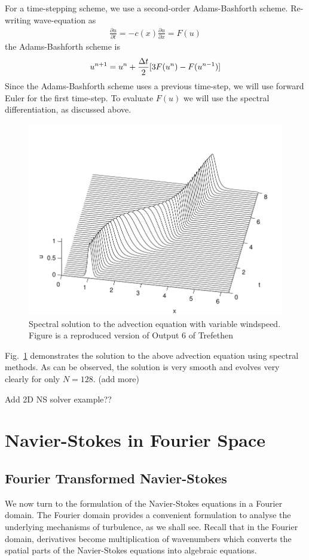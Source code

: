 For a time-stepping scheme, we use a second-order Adams-Bashforth\cite{durran} scheme. Re-writing wave-equation as
\begin{align}
\frac{\partial u}{\partial t} = -c(x)\frac{\partial u}{\partial x} = F(u)
\end{align}
the Adams-Bashforth scheme is
\begin{align}
u^{n+1} = u^{n} + \frac{\Delta t}{2}[3F(u^{n})-F(u^{n-1})]
\end{align}
Since the Adams-Bashforth scheme uses a previous time-step, we will use forward Euler for the first time-step. To evaluate $F(u)$ we will use the spectral differentiation, as discussed above. 
\begin{figure}
\begin{center}
\includegraphics[width=\textwidth]{spectral_example.pdf}
\caption{Spectral solution to the advection equation with variable windspeed. Figure is a reproduced version of Output 6 of Trefethen \cite{trefethen_spectral}}
\end{center}
\label{spectral_example}
\end{figure}
Fig.~\ref{spectral_example} demonstrates the solution to the above advection equation using spectral methods. As can be observed, the solution is very smooth and evolves very clearly for only $N=128$. (add more)

Add 2D NS solver example??

\section{Navier-Stokes in Fourier Space}
\subsection{Fourier Transformed Navier-Stokes}
We now turn to the formulation of the Navier-Stokes equations in a Fourier domain. The Fourier domain provides a convenient formulation to analyse the underlying mechanisms of turbulence, as we shall see. Recall that in the Fourier domain, derivatives become multiplication of wavenumbers which converts the spatial parts of the Navier-Stokes equations into algebraic equations. 

